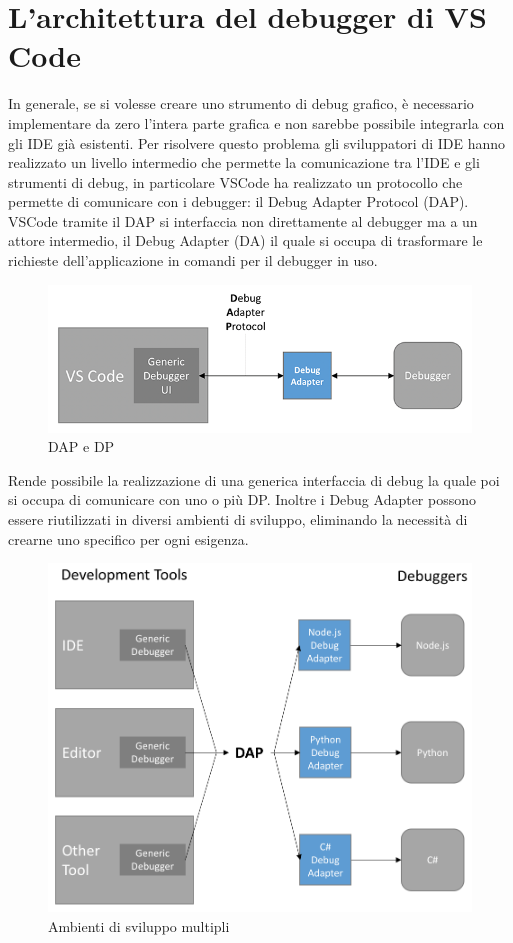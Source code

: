 \section{L'architettura del debugger di VS Code}
In generale, se si volesse creare uno strumento di debug grafico, è necessario implementare da zero l'intera parte grafica e
non sarebbe possibile integrarla con gli IDE già esistenti. Per risolvere questo problema gli sviluppatori di IDE hanno realizzato
un livello intermedio che permette la comunicazione tra l'IDE e gli strumenti di debug, in particolare VSCode ha realizzato un protocollo che permette di comunicare con i debugger: il Debug Adapter Protocol (DAP). VSCode tramite il DAP si interfaccia non direttamente al debugger ma a un attore intermedio, il Debug Adapter (DA) il quale si occupa di trasformare le richieste dell'applicazione in comandi per il debugger in uso.

\begin{figure}[H]
    \centering
    \includegraphics[width=0.7\columnwidth]{images/debug-arch1.png}
    \caption{DAP e DP}
    \label{fig:dap e dp}
\end{figure}

Rende possibile la realizzazione di una generica interfaccia di debug la quale poi si occupa di comunicare con uno o più DP. Inoltre i Debug Adapter possono essere riutilizzati in diversi ambienti di sviluppo, eliminando la necessità di crearne uno specifico per ogni esigenza. 

\begin{figure}[H]
    \centering
    \includegraphics[width=0.7\columnwidth]{images/with-DAP.png}
    \caption{Ambienti di sviluppo multipli}
    \label{fig:Ambienti di sviluppo multipli}
\end{figure}

